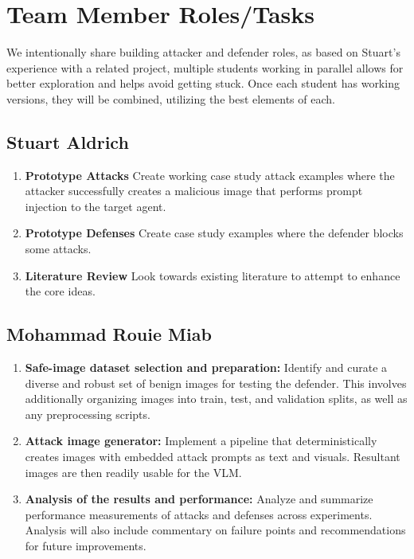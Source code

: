 \documentclass[10pt,twocolumn,letterpaper]{article}
\begin{document}
\section{Team Member Roles/Tasks}
\label{sec:roles}

We intentionally share building attacker and defender roles, as based on Stuart's experience with a related project, multiple students working in parallel allows for better exploration and helps avoid getting stuck. Once each student has working versions, they will be combined, utilizing the best elements of each.

\subsection{Stuart Aldrich}

\begin{enumerate}

    \item \textbf{Prototype Attacks} Create working case study attack examples where the attacker successfully creates a malicious image that performs prompt injection to the target agent.
    \item \textbf{Prototype Defenses} Create case study examples where the defender blocks some attacks.
    \item \textbf{Literature Review} Look towards existing literature to attempt to enhance the core ideas.

\end{enumerate}

\subsection{Mohammad Rouie Miab}

\begin{enumerate}

    \item \textbf{Safe-image dataset selection and preparation:} Identify and curate a diverse and robust set of benign images for testing the defender. This involves additionally organizing images into train, test, and validation splits, as well as any preprocessing scripts.
    \item \textbf{Attack image generator:} Implement a pipeline that deterministically creates images with embedded attack prompts as text and visuals. Resultant images are then readily usable for the VLM.
    \item \textbf{Analysis of the results and performance:} Analyze and summarize performance measurements of attacks and defenses across experiments. Analysis will also include commentary on failure points and recommendations for future improvements.

\end{enumerate}
\end{document}
